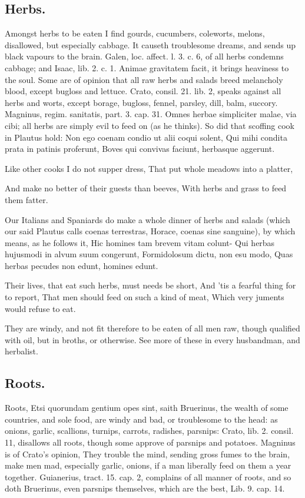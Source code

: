 {{\subsection{Herbs.}
Amongst herbs to be eaten I find gourds, cucumbers,
coleworts, melons, disallowed, but especially cabbage. It causeth
troublesome dreams, and sends up black vapours to the brain. Galen,
loc. affect. l. 3. c. 6, of all herbs condemns cabbage; and Isaac, lib.
2. c. 1. Animae gravitatem facit, it brings heaviness to the soul. Some
are of opinion that all raw herbs and salads breed melancholy blood,
except bugloss and lettuce. Crato, consil. 21. lib. 2, speaks against
all herbs and worts, except borage, bugloss, fennel, parsley, dill,
balm, succory. Magninus, regim. sanitatis, part. 3. cap. 31. Omnes
herbae simpliciter malae, via cibi; all herbs are simply evil to feed
on (as he thinks). So did that scoffing cook in Plautus hold:
Non ego coenam condio ut alii coqui solent,
Qui mihi condita prata in patinis proferunt,
Boves qui convivas faciunt, herbasque aggerunt.


Like other cooks I do not supper dress,
That put whole meadows into a platter,

And make no better of their guests than beeves,
With herbs and grass to feed them fatter.

Our Italians and Spaniards do make a whole dinner of herbs and salads
(which our said Plautus calls coenas terrestras, Horace, coenas sine
sanguine), by which means, as he follows it,
Hic homines tam brevem vitam colunt-
Qui herbas hujusmodi in alvum suum congerunt,
Formidolosum dictu, non esu modo,
Quas herbas pecudes non edunt, homines edunt.

Their lives, that eat such herbs, must needs be short,
And 'tis a fearful thing for to report,
That men should feed on such a kind of meat,
Which very juments would refuse to eat.

They are windy, and not fit therefore to be eaten of all men raw,
though qualified with oil, but in broths, or otherwise. See more of
these in every husbandman, and herbalist.
\subsection{Roots.}
Roots, Etsi quorundam gentium opes sint, saith Bruerinus, the
wealth of some countries, and sole food, are windy and bad, or
troublesome to the head: as onions, garlic, scallions, turnips,
carrots, radishes, parsnips: Crato, lib. 2. consil. 11, disallows all
roots, though  some approve of parsnips and potatoes.
Magninus is of Crato's opinion, They trouble the mind,
sending gross fumes to the brain, make men mad, especially garlic,
onions, if a man liberally feed on them a year together. Guianerius,
tract. 15. cap. 2, complains of all manner of roots, and so doth
Bruerinus, even parsnips themselves, which are the best, Lib. 9. cap.
14.
}}
